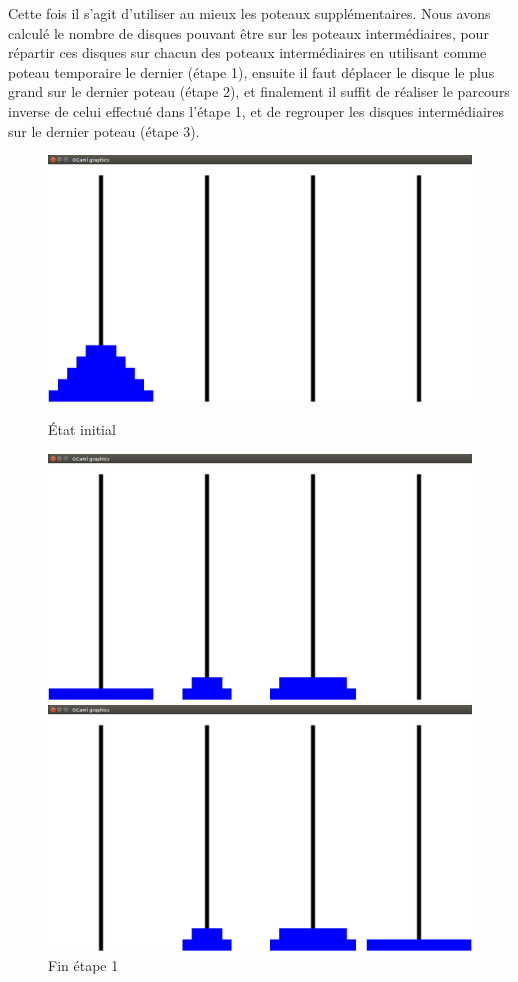 \documentclass[a4paper, 11pt]{article}%
\begin{document}
		Cette fois il s'agit d'utiliser au mieux les poteaux supplémentaires.
		Nous avons calculé le nombre de disques pouvant être sur les poteaux
		intermédiaires, pour répartir ces disques sur chacun des poteaux intermédiaires
		en utilisant comme poteau temporaire le dernier (étape 1), ensuite il faut
		déplacer le disque le plus grand sur le dernier poteau (étape 2), et finalement
		il suffit de réaliser le parcours inverse de celui effectué dans l'étape 1,
		et de regrouper les disques intermédiaires sur le dernier poteau (étape 3).
		
		\begin{figure}[!h]
			  \includegraphics[width=\linewidth]{hanoi_gen_start.png}
			  \caption{État initial}\label{fig:hanoi_gen_start}
			\endminipage\hfill
			  \includegraphics[width=\linewidth]{hanoi_gen_mid1.png}
			  \caption{Fin étape 1}\label{fig:hanoi_gen_mid1}
			\endminipage\hfill
			  \includegraphics[width=\linewidth]{hanoi_gen_mid2.png}

\end{figure}
\end{document}
